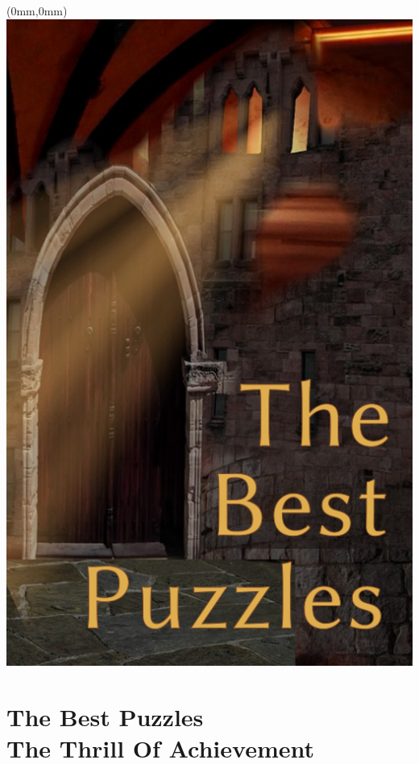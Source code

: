 \documentclass[11.75pt,openany,final]{memoir}
\begin{document}
\chapter*{}
\begin{textblock*}{70.9mm}(0mm,0mm)
  \includegraphics[width=\paperwidth]{./media/images/puzzle_splash}
\end{textblock*}
\chapter{The Best Puzzles\\ \small{The Thrill Of Achievement}}

\end{document}

